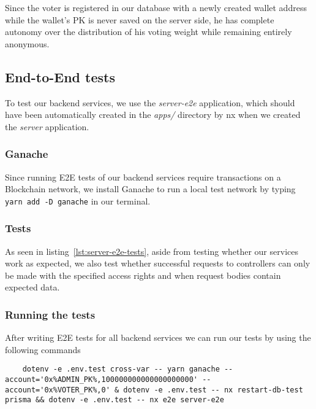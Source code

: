Since the voter is registered in our database with a newly created wallet address while the wallet's \gls{PK} is never saved on the server side, he has complete autonomy over the distribution of his voting weight while remaining entirely anonymous.


\subsection{End-to-End tests}\label{subsec:e2e-tests}

To test our backend services, we use the \emph{server-e2e} application, which should have been automatically created in the \emph{apps/} directory by nx when we created the \emph{server} application.

\subsubsection{Ganache}

Since running \gls{E2E} tests of our backend services require transactions on a \gls{Blockchain} network, we install Ganache to run a local test network by typing \texttt{yarn add -D ganache} in our terminal.

\subsubsection{Tests}


As seen in listing~\ref{lst:server-e2e-tests}, aside from testing whether our services work as expected, we also test whether successful requests to controllers can only be made with the specified access rights and when request bodies contain expected data.

\subsubsection{Running the tests}

After writing \gls{E2E} tests for all backend services we can run our tests by using the following commands


\begin{verbatim}
    dotenv -e .env.test cross-var -- yarn ganache --account='0x%ADMIN_PK%,100000000000000000000' --account='0x%VOTER_PK%,0' & dotenv -e .env.test -- nx restart-db-test prisma && dotenv -e .env.test -- nx e2e server-e2e
\end{verbatim}

